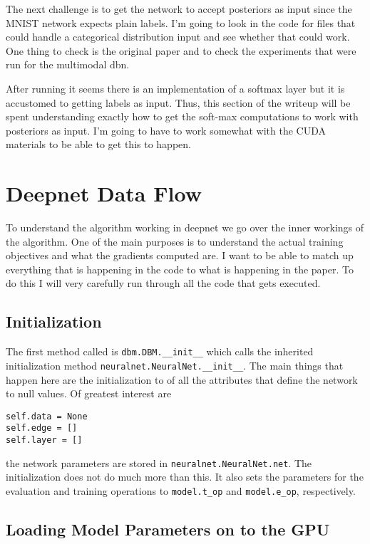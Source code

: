 \documentclass{article} %
\begin{document}
The next challenge is to get the network to accept posteriors as input since the MNIST network expects plain labels. I'm going to
look in the code for files that could handle a categorical distribution input and see whether that could work.  One thing
to check is the original paper and to check the experiments that were run for the multimodal dbn.

After running it seems there is an implementation of a softmax layer but it is accustomed to getting labels as input.  Thus,
this section of the writeup will be spent understanding exactly how to get the soft-max computations to work with posteriors
as input. I'm going to have to work somewhat with the CUDA materials to be able to get this to happen.

\section{Deepnet Data Flow}

To understand the algorithm working in deepnet we go over the inner workings of the algorithm.  One of the main purposes is
to understand the actual training objectives and what the gradients computed are.  I want to be able to match up everything that
is happening in the code to what is happening in the paper.  To do this I will very carefully run through all the code that gets
executed.

\subsection{Initialization}

The first method called is \texttt{dbm.DBM.\_\_init\_\_} which calls the inherited initialization method
\texttt{neuralnet.NeuralNet.\_\_init\_\_}.  The main things that happen here are the initialization to of all the attributes that define the
network to null values.  Of greatest interest are
\begin{verbatim}
self.data = None
self.edge = []
self.layer = []
\end{verbatim}
the network parameters are stored in \texttt{neuralnet.NeuralNet.net}.  The initialization does not do much more than this.
It also sets the parameters for the evaluation and training operations to \texttt{model.t\_op} and
\texttt{model.e\_op}, respectively.

\subsection{Loading Model Parameters on to the GPU}
\end{document}
